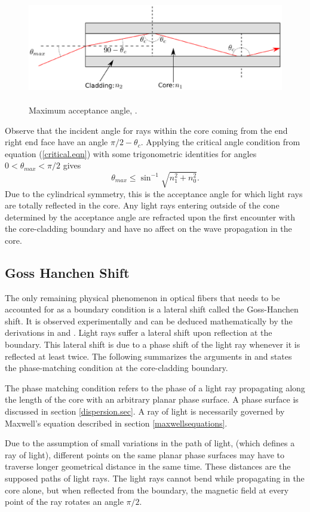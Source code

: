 \documentclass[12pt]{article}
\theoremstyle{definition}
\numberwithin{equation}{section}
\begin{document}
\begin{figure}[h!]
\centerline{\includegraphics[height = 48mm, width=148mm, angle=0]{totalinternal.eps}}
\caption{Maximum acceptance angle, \cite{fig_4}.}
\label{figure4}
\end{figure}
Observe that the incident angle for rays within the core coming from the end right end face have an angle $\pi\slash 2-\theta_c$. Applying the critical angle condition from equation (\ref{critical.eqn}) with some trigonometric identities for angles $0<\theta_{max}<\pi\slash 2$ gives
$$\theta_{max}\leq\sin^{-1}{\sqrt{n_1^2+n_0^2}}.$$
Due to the cylindrical symmetry, this is the acceptance angle for which light rays are totally reflected in the core. Any light rays entering outside of the cone determined by the acceptance angle are refracted upon the first encounter with the core-cladding boundary and have no affect on the wave propagation in the core.
\subsection{Goss Hanchen Shift}
The only remaining physical phenomenon in optical fibers that needs to be accounted for as a boundary condition is a lateral shift called the Goss-Hanchen shift. It is observed experimentally and can be deduced mathematically by the derivations in \cite{Belanger} and \cite{Okamoto}. Light rays suffer a lateral shift upon reflection at the boundary. This lateral shift is due to a phase shift of the light ray whenever it is reflected at least twice. The following summarizes the arguments in \cite{Okamoto} and states the phase-matching condition at the core-cladding boundary.

The phase matching condition refers to the phase of a light ray propagating along the length of the core with an arbitrary planar phase surface. A phase surface is discussed in section \ref{dispersion.sec}. A ray of light is necessarily governed by Maxwell's equation described in section \ref{maxwellsequations}.

Due to the assumption of small variations in the path of light, (which defines a ray of light), different points on the same planar phase surfaces may have to traverse longer geometrical distance in the same time. These distances are the supposed paths of light rays. The light rays cannot bend while propagating in the core alone, but when reflected from the boundary, the magnetic field at every point of the ray rotates an angle $\pi\slash 2$.
\end{document}

